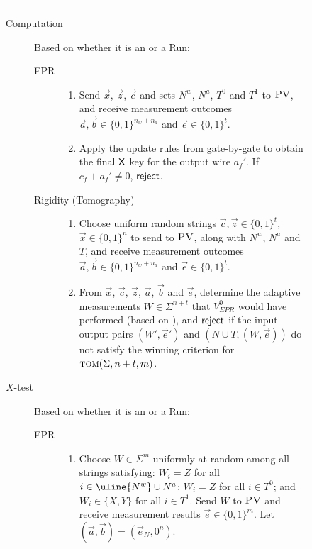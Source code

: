 \documentclass{toc}
\newcommand{\tom}{\textsc{tom}}
\newcommand{\pv}{\textsc{PV}}
\newcommand{\highlight}[1]{\uline{#1}}
\begin{document}
\begin{figure}[H]
\rule[1ex]{\textwidth}{0.5pt}
\vspace{-20pt}
\begin{description}
\item[Computation] Based on whether it is
an  or a  Run:
	\begin{description}
	\item[EPR]
		\begin{enumerate}
		\item[(i)] Send $\vec{x}$, $\vec{z}$, $\vec{c}$ and sets \highlight{$N^w$}, $N^a$, $T^0$
      and $T^1$ to $\pv$, and receive measurement outcomes \highlight{$\vec{a},\vec{b}\in
        \{0,1\}^{n_w + n_a}$} and $\vec{e}\in\{0,1\}^t$.
		\item[(ii)] Apply the update rules from  gate-by-gate to obtain the final $\sf X$ key for the output wire $a_f'$. If $c_f+a_f'\neq 0$, $\sf reject$. 
		\end{enumerate}
	\item[Rigidity (Tomography)]
		\begin{enumerate}
		\item[(i)] Choose uniform random strings $\vec{c},\vec{z}\in\{0,1\}^t$, $\vec{x} \in \{0,1\}^n$ 
      to send to $\pv$, along with \highlight{$N^w$}, $N^a$ and $T$, and receive measurement outcomes \highlight{$\vec{a}, \vec{b}\in \{0,1\}^{n_w + n_a}$} and $\vec{e}\in\{0,1\}^t$. 
		\item[(ii)]
		From $\vec{x}$, $\vec{c}$, $\vec{z}$, $\vec{a}$, $\vec{b}$ and $\vec{e}$, determine the adaptive measurements $W\in\Sigma^{n+t}$ that $V_{EPR}^0$ would have performed (based on ), and $\sf reject$ if the input-output pairs $(W',\vec{e}')$ and $(N\cup T,(W,\vec{e}))$ do not satisfy the winning criterion for $\tom(\Sigma,n+t,m)$.
		\end{enumerate}
	\end{description}
\item[$X$-test] Based on whether it is
an  or a  Run:
\begin{description}
	\item[EPR] 
	\begin{enumerate}
		\item[(i)] Choose $W\in\Sigma^m$ uniformly at random among all strings
      satisfying: $W_i=Z$ for all $i\in \highlight{N^w} \cup N^a$; $W_i=Z$ for all $i\in T^0$; and $W_i\in\{X,Y\}$ for all $i\in T^1$. Send $W$ to $\pv$ and receive measurement results $\vec{e}\in\{0,1\}^m$. Let $(\vec{a},\vec{b})=(\vec{e}_N,0^n)$. 

\end{enumerate}
\end{description}
\end{description}
\end{figure}
\end{document}

